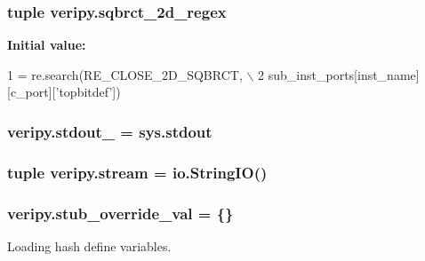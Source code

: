 \hypertarget{namespaceveripy_a3b0f5f7cc0eeac48c1b8c8ca764faf0b}{
\subsubsection[{sqbrct\-\_\-2d\-\_\-regex}]{\setlength{\rightskip}{0pt plus 5cm}tuple veripy.\-sqbrct\-\_\-2d\-\_\-regex}}\label{namespaceveripy_a3b0f5f7cc0eeac48c1b8c8ca764faf0b}
{\bfseries Initial value\-:}
\begin{DoxyCode}
1 = re.search(RE\_CLOSE\_2D\_SQBRCT, \(\backslash\)
2                         sub\_inst\_ports[inst\_name][c\_port][\textcolor{stringliteral}{'topbitdef'}])
\end{DoxyCode}
\hypertarget{namespaceveripy_a4fdf3a6b0a5f3ab656eb7e0bb38322de}{
\subsubsection[{stdout\-\_\-}]{\setlength{\rightskip}{0pt plus 5cm}veripy.\-stdout\-\_\- = sys.\-stdout}}\label{namespaceveripy_a4fdf3a6b0a5f3ab656eb7e0bb38322de}
\hypertarget{namespaceveripy_a5ab193beb474f15a242fa9d804d0ccb6}{
\subsubsection[{stream}]{\setlength{\rightskip}{0pt plus 5cm}tuple veripy.\-stream = io.\-String\-I\-O()}}\label{namespaceveripy_a5ab193beb474f15a242fa9d804d0ccb6}
\hypertarget{namespaceveripy_aa9f520efe95ce8cdbd3fbe0ce8ef3aca}{
\subsubsection[{stub\-\_\-override\-\_\-val}]{\setlength{\rightskip}{0pt plus 5cm}veripy.\-stub\-\_\-override\-\_\-val = \{\}}}\label{namespaceveripy_aa9f520efe95ce8cdbd3fbe0ce8ef3aca}


Loading hash define variables. 

